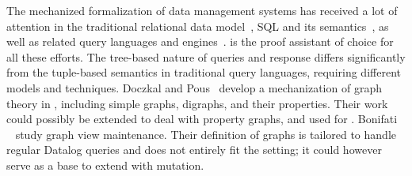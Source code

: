 The mechanized formalization of data management systems has received a lot of attention in the traditional relational data model~\cite{relationalcoq}, SQL and its semantics~\cite{sqlequiv, hottsql, vesqlengines, vesqlsemantics}, as well as related query languages and engines~\cite{certifdatalog, qcert}.
\coq is the proof assistant of choice for all these efforts. The tree-based nature of \gql queries and response differs significantly from the tuple-based semantics in traditional query languages, requiring different models and techniques.
Doczkal and Pous~\cite{graphtheory} develop a mechanization of graph theory in \coq, including simple graphs, digraphs, and their properties. Their work could possibly be extended to deal with property graphs, and used for \gcoql.
Bonifati \etal~\cite{graphviewmaint} study graph view maintenance. Their definition of graphs is tailored to handle regular Datalog queries and does not entirely fit the \gql setting; it could however serve as a base to extend \gcoql with mutation.



